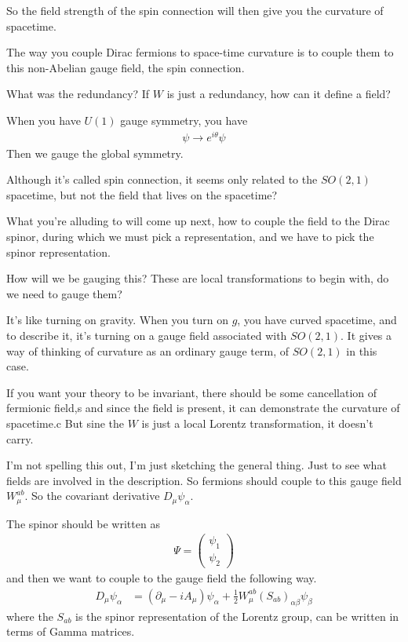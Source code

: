 So the field strength of the spin connection will then give you the curvature of
spacetime.

The way you couple Dirac fermions to space-time curvature is to couple them to
this non-Abelian gauge field,
the spin connection.

\begin{question}
    What was the redundancy?
    If $W$ is just a redundancy,
    how can it define a field?
\end{question}
When you have $U(1)$ gauge symmetry,
you have
\begin{align}
    \psi \to e^{i\theta} \psi
\end{align}
Then we gauge the global symmetry.

\begin{question}
    Although it's called spin connection,
    it seems only related to the $SO(2, 1)$ spacetime,
    but not the field that lives on the spacetime?
\end{question}
What you're alluding to will come up next,
how to couple the field to the Dirac spinor,
during which we must pick a representation,
and we have to pick the spinor representation.

\begin{question}
    How will we be gauging this?
    These are local transformations to begin with,
    do we need to gauge them?
\end{question}
It's like turning on gravity.
When you turn on $g$,
you have curved spacetime,
and to describe it,
it's turning on a gauge field associated with $SO(2, 1)$.
It gives a way of thinking of curvature as an ordinary gauge term,
of $SO(2,1)$ in this case.

\begin{question}
    If you want your theory to be invariant,
    there should be some cancellation of fermionic field,s
    and since the field is present,
    it can demonstrate the curvature of spacetime.c
    But sine the $W$ is just a local Lorentz transformation,
    it doesn't carry.
\end{question}
I'm not spelling this out,
I'm just sketching the general thing.
Just to see what fields are involved in the description.
So fermions should couple to this gauge field $W_\mu^{ab}$.
So the covariant derivative $D_\mu \psi_\alpha$.

The spinor should be written as
\begin{align}
    \Psi =
    \begin{pmatrix}
        \psi_1\\
        \psi_2
    \end{pmatrix}
\end{align}
and then we want to couple to the gauge field the following way.
\begin{align}
    D_{\mu}\psi_\alpha &=
    \left( \partial_\mu - iA_\mu \right)\psi_\alpha
    + \frac{1}{2} W_\mu^{ab}\left( S_{ab} \right)_{\alpha\beta}\psi_\beta
\end{align}
where the $S_{ab}$ is the spinor representation of the Lorentz group,
can be written in terms of Gamma matrices.

